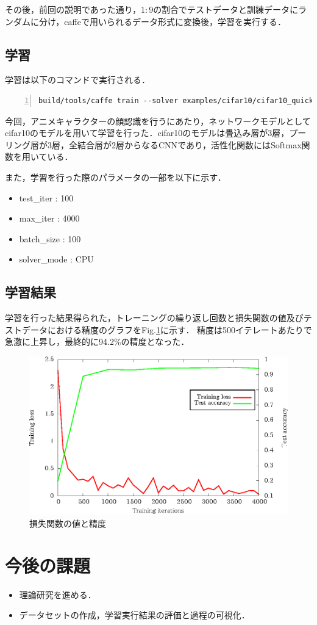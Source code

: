 \documentclass[a4paper,10pt]{jsarticle}
\begin{document}
その後，前回の説明であった通り，$1:9$の割合でテストデータと訓練データにランダムに分け，caffeで用いられるデータ形式に変換後，学習を実行する．

\subsection{学習}
学習は以下のコマンドで実行される．

\begin{lstlisting}[basicstyle=\ttfamily\footnotesize, frame=single, tabsize=2,showtabs,firstnumber=1, numbers=left, breaklines=true]
build/tools/caffe train --solver examples/cifar10/cifar10_quick_solver.prototxt
\end{lstlisting}

今回，アニメキャラクターの顔認識を行うにあたり，ネットワークモデルとしてcifar10のモデルを用いて学習を行った．cifar10のモデルは畳込み層が3層，プーリング層が3層，全結合層が2層からなるCNNであり，活性化関数にはSoftmax関数を用いている．

また，学習を行った際のパラメータの一部を以下に示す．
\begin{itemize}
 \item test\_iter : 100
 \item max\_iter : 4000
 \item batch\_size : 100
 \item solver\_mode : CPU
\end{itemize}

\subsection{学習結果}
学習を行った結果得られた，トレーニングの繰り返し回数と損失関数の値及びテストデータにおける精度のグラフをFig.\ref{210045_15Jul15}に示す．
精度は500イテレートあたりで急激に上昇し，最終的に94.2\%の精度となった．

\begin{figure}[ht]
 \centering
 \includegraphics[scale=1.0]{fig/eps/result_train_test_graph.eps}
 \caption{損失関数の値と精度 }
 \label{210045_15Jul15}
\end{figure}

\section{今後の課題}
\begin{itemize}
 \item 理論研究を進める．
 \item データセットの作成，学習実行結果の評価と過程の可視化．
\end{itemize}
\end{document}
